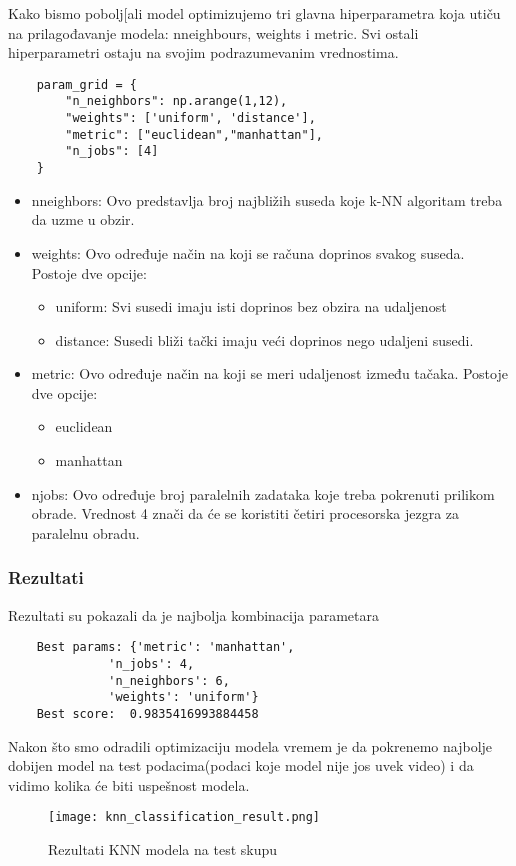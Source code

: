 \documentclass[a4paper,12pt]{article}
\begin{document}
\clearpage
Kako bismo pobolj[ali model optimizujemo tri glavna hiperparametra koja utiču na prilagođavanje modela: n\textunderscore neighbours, weights i metric. Svi ostali hiperparametri ostaju na svojim podrazumevanim vrednostima.
\begin{verbatim}
    param_grid = {
        "n_neighbors": np.arange(1,12),
        "weights": ['uniform', 'distance'],
        "metric": ["euclidean","manhattan"],
        "n_jobs": [4]
    }
\end{verbatim}
\begin{itemize}
    \item n\textunderscore neighbors: Ovo predstavlja broj najbližih suseda koje k-NN algoritam treba da uzme u obzir.
    \item weights: Ovo određuje način na koji se računa doprinos svakog suseda. Postoje dve opcije:
    \begin{itemize}
        \item uniform: Svi susedi imaju isti doprinos bez obzira na udaljenost
        \item distance: Susedi bliži tački imaju veći doprinos nego udaljeni susedi.
    \end{itemize}
    \item metric: Ovo određuje način na koji se meri udaljenost između tačaka. Postoje dve opcije:
    \begin{itemize}
        \item euclidean
        \item manhattan
    \end{itemize}
    \item n\textunderscore jobs: Ovo određuje broj paralelnih zadataka koje treba pokrenuti prilikom obrade. Vrednost 4 znači da će se koristiti četiri procesorska jezgra za paralelnu obradu.

\end{itemize}
\subsubsection{Rezultati}
Rezultati su pokazali da je najbolja kombinacija parametara
\begin{verbatim}
    Best params: {'metric': 'manhattan',
              'n_jobs': 4,
              'n_neighbors': 6,
              'weights': 'uniform'}
    Best score:  0.9835416993884458
\end{verbatim}

Nakon što smo odradili optimizaciju modela vremem je da pokrenemo najbolje dobijen model na test podacima(podaci koje model nije jos uvek video) i da vidimo kolika će biti uspešnost modela.
\clearpage
\begin{figure}[h!]
\centering
\texttt{[image: knn\_classification\_result.png]}
\caption{Rezultati KNN modela na test skupu}
\label{fig:knn_classification_result}
\end{figure}
\end{document}

